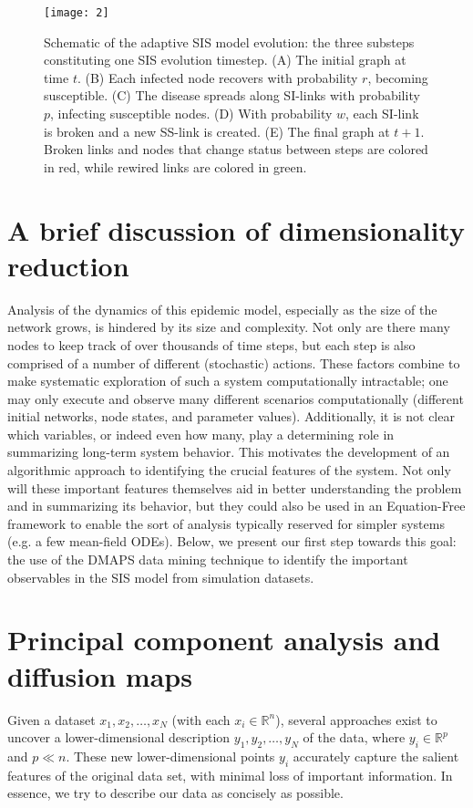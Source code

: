 \begin{figure}[!htp]
\centering
\texttt{[image: 2]}
\caption{Schematic of the adaptive SIS model evolution: the three
  substeps constituting one SIS evolution timestep. (A) The initial
  graph at time $t$. (B) Each infected node recovers with probability
  $r$, becoming susceptible. (C) The disease spreads along SI-links
  with probability $p$, infecting susceptible nodes. (D) With
  probability $w$, each SI-link is broken and a new SS-link is
  created. (E) The final graph at $t+1$. Broken links and nodes that
  change status between steps are colored in red, while rewired links
  are colored in green. \label{fig:sis2}}
\end{figure}

\section{A brief discussion of dimensionality reduction}

Analysis of the dynamics of this epidemic model, especially as the
size of the network grows, is hindered by its size and complexity. Not
only are there many nodes to keep track of over thousands of time
steps, but each step is also comprised of a number of different
(stochastic) actions. These factors combine to make systematic
exploration of such a system computationally intractable; one may only
execute and observe many different scenarios computationally
(different initial networks, node states, and parameter
values). Additionally, it is not clear which variables, or indeed even
how many, play a determining role in summarizing long-term system
behavior. This motivates the development of an algorithmic approach to
identifying the crucial features of the system. Not only will these
important features themselves aid in better understanding the problem
and in summarizing its behavior, but they could also be used in an
Equation-Free framework to enable the sort of analysis typically
reserved for simpler systems (e.g. a few mean-field ODEs). Below, we
present our first step towards this goal: the use of the DMAPS data
mining technique to identify the important observables in the SIS
model from simulation datasets.

\section{Principal component analysis and diffusion maps}

Given a dataset ${x_1, x_2, \dots, x_N}$ (with each
$x_i \in \mathbb{R}^n$), several approaches exist to uncover a
lower-dimensional description ${y_1, y_2, \dots, y_N}$ of the data,
where $y_i \in \mathbb{R}^p$ and $p \ll n$. These new
lower-dimensional points $y_i$ accurately capture the salient features
of the original data set, with minimal loss of important
information. In essence, we try to describe our data as concisely as
possible.

